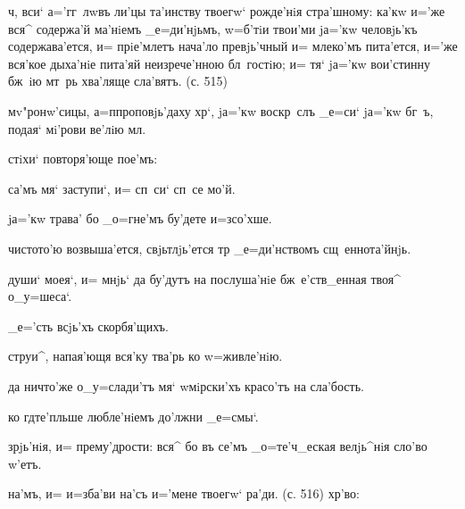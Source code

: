ч, вси` а='гг~лwвъ ли'цы та'инству твоегw` рожде'нiя 
стра'шному: ка'кw и='же вся^ содержа'й ма'нiемъ 
_е=ди'нjьмъ, w=б'тiи твои'ми jа='кw человjь'къ 
содержава'ется, и= прiе'млетъ нача'ло превjь'чный и= 
млеко'мъ пита'ется, и='же вся'кое дыха'нiе пита'яй 
неизрече'нною бл~гостiю; и= тя` jа='кw вои'стинну бж~iю 
мт~рь хва'ляще сла'вятъ. (с. 515)


мv"ронw'сицы, а=п проповjь'даху хр`, jа='кw 
воскр~слъ _е=си` jа='кw бг~ъ, подая` мi'рови ве'лiю 
мл.

стiхи` повторя'юще пое'мъ:%

са'мъ мя` заступи`, и= сп~си` сп~се мо'й.

jа='кw трава' бо _о=гне'мъ бу'дете и=зсо'хше.

чистото'ю возвыша'ется, свjьтлjь'ется тр 
_е=ди'нствомъ сщ~еннота'йнjь.



души` моея`, и= мнjь` да бу'дутъ на послуша'нiе 
бж~е'ств_енная твоя^ о_у=шеса`.

_е='сть всjь'хъ скорбя'щихъ.

струи^, напая'ющя вся'ку тва'рь ко w=живле'нiю.



да ничто'же о_у=слади'тъ мя` w\т мiрски'хъ красо'тъ на 
сла'бость.

ко гд те'пльше любле'нiемъ до'лжни _е=смы`.

зрjь'нiя, и= прему'дрости: вся^ бо въ се'мъ _о=те'ч_еская 
велjь^нiя сло'во w'етъ.


на'мъ, и= и=зба'ви на'съ и='мене твоегw` ра'ди. (с. 516) 
хр'во: %

